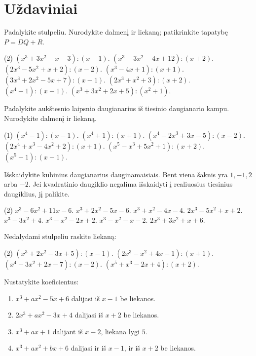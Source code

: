 \documentclass[11pt,a4paper]{scrartcl}
\newcommand{\uzd}[1]{\Needspace{5\baselineskip}\begin{problem}#1\end{problem}}
\begin{document}
\clearpage
\section{Uždaviniai}
\uzd{Padalykite stulpeliu. Nurodykite dalmenį ir liekaną; patikrinkite tapatybę \(P=DQ+R\).
\begin{tasks}(2)
\task \((x^3+3x^2-x-3):(x-1)\).
\task \((x^3-3x^2-4x+12):(x+2)\).
\task \((2x^3-5x^2+x+2):(x-2)\).
\task \((x^3-4x+1):(x+1)\).
\task \((3x^3+2x^2-5x+7):(x-1)\).
\task \((2x^3+x^2+3):(x+2)\).
\task \((x^4-1):(x-1)\).
\task \((x^3+3x^2+2x+5):(x^2+1)\).
\end{tasks}}
\uzd{Padalykite aukštesnio laipsnio daugianarius iš tiesinio daugianario kampu. Nurodykite dalmenį ir liekaną.
\begin{tasks}(1)
\task \((x^4-1):(x-1)\).
\task \((x^4+1):(x+1)\).
\task \((x^4-2x^3+3x-5):(x-2)\).
\task \((2x^4+x^3-4x^2+2):(x+1)\).
\task \((x^5-x^3+5x^2+1):(x+2)\).
\task \((x^5-1):(x-1)\).
\end{tasks}}
\uzd{Išskaidykite kubinius daugianarius dauginamaisiais. Bent viena šaknis yra \(1,-1,2\) arba \(-2\). Jei kvadratinio daugiklio negalima išskaidyti į realiuosius tiesinius daugiklius, jį palikite.
\begin{tasks}(2)
\task \(x^3-6x^2+11x-6\).
\task \(x^3+2x^2-5x-6\).
\task \(x^3+x^2-4x-4\).
\task \(2x^3-5x^2+x+2\).
\task \(x^3-3x^2+4\).
\task \(x^3-x^2-2x+2\).
\task \(x^3-x^2-x-2\).
\task \(2x^3+3x^2+x+6\).
\end{tasks}}
\uzd{Nedalydami stulpeliu raskite liekaną:
\begin{tasks}(2)
\task \((x^3+2x^2-3x+5):(x-1)\).
\task \((2x^3-x^2+4x-1):(x+1)\).
\task \((x^4-3x^2+2x-7):(x-2)\).
\task \((x^5+x^3-2x+4):(x+2)\).
\end{tasks}}
\uzd{Nustatykite koeficientus:
\begin{enumerate}[label=(\arabic*),leftmargin=*,itemsep=.3em]
\item \(x^3+ax^2-5x+6\) dalijasi iš \(x-1\) be liekanos.
\item \(2x^3+ax^2-3x+4\) dalijasi iš \(x+2\) be liekanos.
\item \(x^3+ax+1\) dalijant iš \(x-2\), liekana lygi \(5\).
\item \(x^3+ax^2+bx+6\) dalijasi ir iš \(x-1\), ir iš \(x+2\) be liekanos.
\end{enumerate}}
\end{document}
